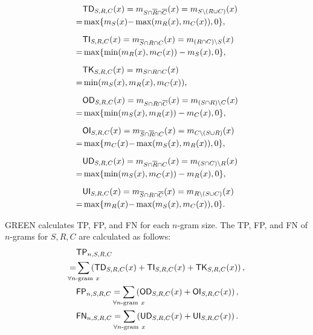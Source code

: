\documentclass[11pt]{article}
\newcommand{\forallngramx}{\forall n\mathchar`-\mathrm{gram}\ x}
\begin{document}
\begin{align}
    & \textsf{TD}_{S, R, C} (x) 
    = m_{S \cap \overline{R} \cap \overline{C}} (x)
    = m_{S \setminus (R \cup C)} (x) \nonumber \\ 
    = & \max\{m_S (x) \scalebox{1}[1]{\ensuremath{-}} \max(m_R (x), m_C (x)), 0\}, \label{eq:true_delete}
    \\[2\jot]
    & \textsf{TI}_{S, R, C} (x)
    = m_{\overline{S} \cap R \cap C} (x)
    = m_{(R \cap C) \setminus S} (x) \nonumber \\
    = & \max\{\min(m_R (x), m_C (x)) - m_S (x), 0\}, \label{eq:true_insert} \\[2\jot]
    & \textsf{TK}_{S, R, C} (x)
    = m_{S \cap R \cap C}(x) \nonumber \\
    = & \min(m_S(x), m_R(x), m_C (x)), \label{eq:true_keep}
    \\[2\jot]
    & \textsf{OD}_{S, R, C} (x)
    = m_{S \cap R \cap \overline{C}} (x)
    = m_{(S \cap R) \setminus C} (x) \nonumber \\
    = & \max\{\min(m_S (x), m_R (x)) - m_C (x), 0\}, \label{eq:over_delete} \\[2\jot]
    & \textsf{OI}_{S, R, C} (x)
    = m_{\overline{S} \cap \overline{R} \cap C} (x)
    = m_{C \setminus (S \cup R)} (x) \nonumber \\
    = & \max\{m_C (x) \scalebox{1}[1]{\ensuremath{-}} \max(m_S (x), m_R (x)), 0\}, \label{eq:over_insert}
    \\[2\jot]
    & \textsf{UD}_{S, R, C} (x)
    = m_{S \cap \overline{R} \cap C} (x)
    = m_{(S \cap C) \setminus R} (x) \nonumber \\
    = & \max\{\min(m_S (x), m_C (x)) - m_R (x), 0\}, \label{eq:under_delete}
    \\[2\jot]
    & \textsf{UI}_{S, R, C} (x)
    = m_{\overline{S} \cap R \cap \overline{C}} (x)
    = m_{R \setminus (S \cup C)} (x) \nonumber \\
    = & \max\{m_R (x) \scalebox{1}[1]{\ensuremath{-}} \max(m_S (x), m_C (x)), 0\}. \label{eq:under_insert}
\end{align}
\endgroup

GREEN calculates \textsf{TP}, \textsf{FP}, and \textsf{FN} for each $n$-gram size.
The \textsf{TP}, \textsf{FP}, and \textsf{FN} of $n$-grams for $S, R, C$ are calculated as follows:
\begingroup
\allowdisplaybreaks
\begin{align*}
    & \textsf{TP}_{n, S, R, C} \\
    = & \sum_{\mathclap{\forallngramx}}
    \left( \textsf{TD}_{S,R,C} (x) + \textsf{TI}_{S,R,C} (x) + \textsf{TK}_{S,R,C} (x) \right), \\
    & \textsf{FP}_{n, S, R, C}
    = \sum_{\mathclap{\forallngramx}}
    \left( \textsf{OD}_{S,R,C} (x) + \textsf{OI}_{S,R,C} (x) \right), \\
    & \textsf{FN}_{n, S, R, C}
    = \sum_{\mathclap{\forallngramx}}
    \left( \textsf{UD}_{S,R,C} (x) + \textsf{UI}_{S,R,C} (x) \right).
\end{align*}
\endgroup
\end{document}
